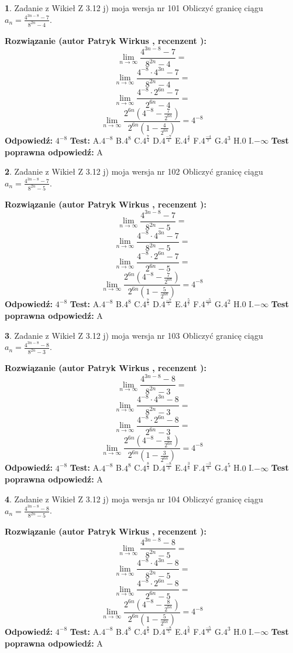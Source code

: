 \documentclass[12pt, a4paper]{article}
\theoremstyle{definition} %
\newtheorem{zad}{}
\newcommand{\zadStart}[1]{\begin{zad}#1\newline}
\newcommand{\zadStop}{\end{zad}}
\newcommand{\rozwStart}[2]{\noindent \textbf{Rozwiązanie (autor #1 , recenzent #2): }\newline}
\newcommand{\rozwStop}{\newline}
\newcommand{\odpStart}{\noindent \textbf{Odpowiedź:}\newline}
\newcommand{\odpStop}{\newline}
\newcommand{\testStart}{\noindent \textbf{Test:}\newline}
\newcommand{\testStop}{\newline}
\newcommand{\kluczStart}{\noindent \textbf{Test poprawna odpowiedź:}\newline}
\newcommand{\kluczStop}{\newline}
\begin{document}
\zadStart{Zadanie z Wikieł Z 3.12 j) moja wersja nr 101}
Obliczyć granicę ciągu $a_{n}=\frac{4^{3n-8}-7}{8^{2n}-4}$.
\zadStop
\rozwStart{Patryk Wirkus}{}
$$\lim\limits_{n\to\infty}\frac{4^{3n-8}-7}{8^{2n}-4}=$$
$$\lim\limits_{n\to\infty}\frac{4^{-8} \cdot 4^{3n}-7}{8^{2n}-4}=$$
$$\lim\limits_{n\to\infty}\frac{4^{-8} \cdot 2^{6n}-7}{2^{6n}-4}=$$
$$\lim\limits_{n\to\infty}\frac{2^{6n}(4^{-8} - \frac{7}{2^{6n}})}{2^{6n}(1-\frac{4}{2^{6n}})}= 4^{-8}$$
\rozwStop
\odpStart
$4^{-8}$
\odpStop
\testStart
A.$4^{-8}$
B.$4^{8}$
C.$4^{\frac{7}{4}}$
D.$4^{\frac{-7}{4}}$
E.$4^{\frac{4}{7}}$
F.$4^{\frac{-4}{7}}$
G.$4^{3}$
H.$0$
I.$-\infty$
\testStop
\kluczStart
A
\kluczStop



\zadStart{Zadanie z Wikieł Z 3.12 j) moja wersja nr 102}
Obliczyć granicę ciągu $a_{n}=\frac{4^{3n-8}-7}{8^{2n}-5}$.
\zadStop
\rozwStart{Patryk Wirkus}{}
$$\lim\limits_{n\to\infty}\frac{4^{3n-8}-7}{8^{2n}-5}=$$
$$\lim\limits_{n\to\infty}\frac{4^{-8} \cdot 4^{3n}-7}{8^{2n}-5}=$$
$$\lim\limits_{n\to\infty}\frac{4^{-8} \cdot 2^{6n}-7}{2^{6n}-5}=$$
$$\lim\limits_{n\to\infty}\frac{2^{6n}(4^{-8} - \frac{7}{2^{6n}})}{2^{6n}(1-\frac{5}{2^{6n}})}= 4^{-8}$$
\rozwStop
\odpStart
$4^{-8}$
\odpStop
\testStart
A.$4^{-8}$
B.$4^{8}$
C.$4^{\frac{7}{5}}$
D.$4^{\frac{-7}{5}}$
E.$4^{\frac{5}{7}}$
F.$4^{\frac{-5}{7}}$
G.$4^{2}$
H.$0$
I.$-\infty$
\testStop
\kluczStart
A
\kluczStop



\zadStart{Zadanie z Wikieł Z 3.12 j) moja wersja nr 103}
Obliczyć granicę ciągu $a_{n}=\frac{4^{3n-8}-8}{8^{2n}-3}$.
\zadStop
\rozwStart{Patryk Wirkus}{}
$$\lim\limits_{n\to\infty}\frac{4^{3n-8}-8}{8^{2n}-3}=$$
$$\lim\limits_{n\to\infty}\frac{4^{-8} \cdot 4^{3n}-8}{8^{2n}-3}=$$
$$\lim\limits_{n\to\infty}\frac{4^{-8} \cdot 2^{6n}-8}{2^{6n}-3}=$$
$$\lim\limits_{n\to\infty}\frac{2^{6n}(4^{-8} - \frac{8}{2^{6n}})}{2^{6n}(1-\frac{3}{2^{6n}})}= 4^{-8}$$
\rozwStop
\odpStart
$4^{-8}$
\odpStop
\testStart
A.$4^{-8}$
B.$4^{8}$
C.$4^{\frac{8}{3}}$
D.$4^{\frac{-8}{3}}$
E.$4^{\frac{3}{8}}$
F.$4^{\frac{-3}{8}}$
G.$4^{5}$
H.$0$
I.$-\infty$
\testStop
\kluczStart
A
\kluczStop



\zadStart{Zadanie z Wikieł Z 3.12 j) moja wersja nr 104}
Obliczyć granicę ciągu $a_{n}=\frac{4^{3n-8}-8}{8^{2n}-5}$.
\zadStop
\rozwStart{Patryk Wirkus}{}
$$\lim\limits_{n\to\infty}\frac{4^{3n-8}-8}{8^{2n}-5}=$$
$$\lim\limits_{n\to\infty}\frac{4^{-8} \cdot 4^{3n}-8}{8^{2n}-5}=$$
$$\lim\limits_{n\to\infty}\frac{4^{-8} \cdot 2^{6n}-8}{2^{6n}-5}=$$
$$\lim\limits_{n\to\infty}\frac{2^{6n}(4^{-8} - \frac{8}{2^{6n}})}{2^{6n}(1-\frac{5}{2^{6n}})}= 4^{-8}$$
\rozwStop
\odpStart
$4^{-8}$
\odpStop
\testStart
A.$4^{-8}$
B.$4^{8}$
C.$4^{\frac{8}{5}}$
D.$4^{\frac{-8}{5}}$
E.$4^{\frac{5}{8}}$
F.$4^{\frac{-5}{8}}$
G.$4^{3}$
H.$0$
I.$-\infty$
\testStop
\kluczStart
A
\kluczStop
\end{document}
